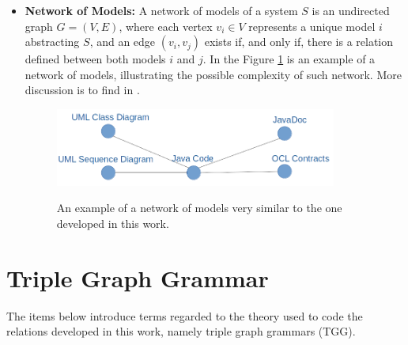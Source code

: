 \documentclass[tuberlin,cic,tc,english,noabntcite, oneside]{iiufrgs}
\begin{document}
\begin{itemize}
	\item \textbf{Network of Models:} A network of models of a system $S$ is an undirected graph $G = (V,E)$, where each vertex $v_i \in V$ represents a unique model $i$ abstracting $S$, and an edge $(v_i, v_j)$ exists if, and only if, there is a relation defined between both models $i$ and $j$. In the Figure \ref{fig:network_example_01} is an example of a network of models, illustrating the possible complexity of such network. More discussion is to find in \citet{mens2006taxonomy}.

	\begin{figure}[H]
		\centering
	    \caption{An example of a network of models very similar to the one developed in this work.}
	    \includegraphics[width=25em]{network_example_01}
	    \label{fig:network_example_01}
	\end{figure}
\end{itemize}
	
\section{Triple Graph Grammar}
The items below introduce terms regarded to the theory used to code the relations developed in this work, namely triple graph grammars (TGG).
\end{document}
